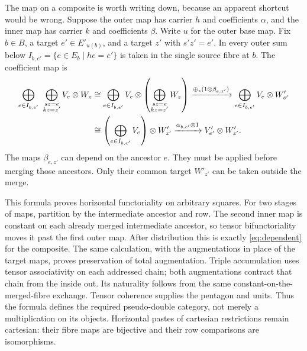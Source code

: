 \documentclass[11pt]{article}
\numberwithin{equation}{section}
\theoremstyle{definition}\newtheorem{definition}[theorem]{Definition}
\begin{document}
The map on a composite is worth writing down, because an apparent
shortcut would be wrong. Suppose the outer map has carrier $h$ and
coefficients $\alpha$, and the inner map has carrier $k$ and coefficients
$\beta$. Write $u$ for the outer base map. Fix $b\in B$, a target
$e'\in E'_{u(b)}$, and a target $z'$ with $s'z'=e'$. In every outer
sum below $I_{b,e'}=\{e\in E_b\mid he=e'\}$ is taken in the single
source fibre at $b$. The coefficient map is
\begin{align}
 \bigoplus_{e\in I_{b,e'}}\ \bigoplus_{\substack{sz=e\\kz=z'}}V_e\otimes W_z
 &\cong\bigoplus_{e\in I_{b,e'}}V_e\otimes
                \left(\bigoplus_{\substack{sz=e\\kz=z'}}W_z\right)
 \xrightarrow{\oplus_e(1\otimes\beta_{e,z'})}
              \bigoplus_{e\in I_{b,e'}}V_e\otimes W'_{z'}\notag\\
 &\cong\left(\bigoplus_{e\in I_{b,e'}}V_e\right)\otimes W'_{z'}
 \xrightarrow{\alpha_{b,e'}\otimes1}V'_{e'}\otimes W'_{z'}.
 \label{eq:dependent}
\end{align}
The maps $\beta_{e,z'}$ can depend on the ancestor $e$. They must be
applied before merging those ancestors. Only their common target
$W'_{z'}$ can be taken outside the merge.

This formula proves horizontal functoriality on arbitrary squares.
For two stages of maps, partition by the intermediate ancestor and row.
The second inner map is constant on each already merged intermediate
ancestor, so tensor bifunctoriality moves it past the first outer map.
After distribution this is exactly \eqref{eq:dependent} for the composite.
The same calculation, with the augmentations in place of the target
maps, proves preservation of total augmentation. Triple accumulation
uses tensor associativity on each addressed chain; both augmentations
contract that chain from the inside out. Its naturality follows from the
same constant-on-the-merged-fibre exchange. Tensor coherence supplies
the pentagon and units. Thus the formula defines the required
pseudo-double category, not merely a multiplication on its objects.
Horizontal pastes of cartesian restrictions remain cartesian: their
fibre maps are bijective and their row comparisons are isomorphisms.
\end{document}

